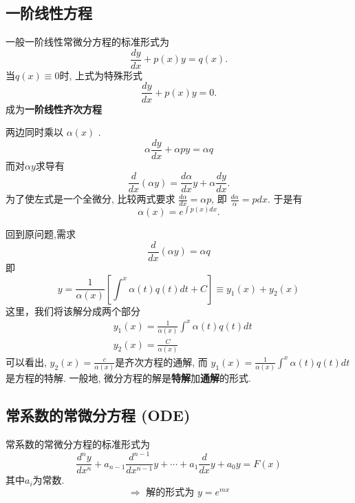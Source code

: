 \subsection{一阶线性方程}
一般一阶线性常微分方程的标准形式为
\begin{equation}
    \frac{d y}{d x}+p(x) y=q(x).
\end{equation}
当$q(x) \equiv 0$时, 上式为特殊形式
\begin{equation}
    \frac{d y}{d x}+p(x) y = 0.
\end{equation}
成为\textbf{一阶线性齐次方程}

两边同时乘以 $\alpha(x)$ .
\begin{equation}
     \alpha \frac{d y}{d x}+\alpha p y=\alpha q 
\end{equation}
而对$\alpha y$求导有
\begin{equation}
    \frac{d}{d x}(\alpha y)=\frac{d \alpha}{d x} y+\alpha \frac{d y}{d x} .
\end{equation}
为了使左式是一个全微分, 比较两式要求
$\frac{d \alpha}{d x}=\alpha p $, 即 $\frac{d \alpha}{\alpha}=p d x $. 于是有
\begin{equation}
    \alpha(x)=e^{\int p(x) d x}.
\end{equation}

回到原问题,需求
$$\frac{d}{d x}(\alpha y)=\alpha q $$
即
\begin{equation}
    y=\frac{1}{\alpha(x)}\left[\int^x \alpha(t) q(t) dt+C\right] \equiv y_1(x)+y_2(x)
\end{equation}
这里，我们将该解分成两个部分
\begin{equation}
\begin{aligned}
& y_1(x)=\frac{1}{\alpha(x)} \int^x \alpha(t) q(t) d t \\
& y_2(x)=\frac{C}{\alpha(x)}
\end{aligned}
\end{equation}
可以看出, $y_2(x)=\frac{c}{\alpha(x)}$是齐次方程的通解,
而 $y_1(x)=\frac{1}{\alpha(x)} \int^x \alpha(t) q(t) d t$是方程的特解.
一般地, 微分方程的解是\textbf{特解}加\textbf{通解}的形式.




\subsection{ 常系数的常微分方程 (ODE)}
常系数的常微分方程的标准形式为
\begin{equation}
\frac{d^n y}{d x^n}+a_{n-1}\frac{d^{n-1} }{d x^{n-1}} y  + \cdots +a_{1} \frac{d}{d x} y+a_0 y=F(x)
\end{equation}
其中$a_i$为常数.
$$
\Rightarrow \text { 解的形式为 } y=e^{m x}
$$

